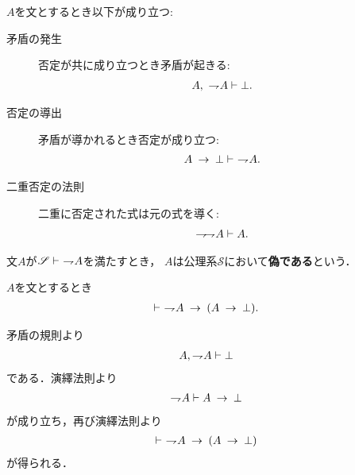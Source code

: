 	\begin{screen}
		\begin{logicalaxm}[矛盾と否定に関する規則]\label{logicalaxm:rules_of_contradiction}
			$A$を文とするとき以下が成り立つ:
			\begin{description}
				\item[矛盾の発生] 否定が共に成り立つとき矛盾が起きる:
					\begin{align}
						A,\ \rightharpoondown\hspace{-0.25em} A \vdash \bot.
					\end{align}
				\item[否定の導出] 矛盾が導かれるとき否定が成り立つ:
					\begin{align}
						A \hspace{0.25em}\rightarrow\hspace{0.25em} \bot \vdash\ \rightharpoondown\hspace{-0.25em} A.
					\end{align}
				\item[二重否定の法則] 二重に否定された式は元の式を導く:
					\begin{align}
						\rightharpoondown\hspace{-0.25em} \rightharpoondown\hspace{-0.25em} A \vdash A.
					\end{align}
			\end{description}
		\end{logicalaxm}
	\end{screen}
	
	文$A$が$\mathscr{S} \vdash\ \rightharpoondown\hspace{-0.25em} A$を満たすとき，
	$A$は公理系$\mathscr{S}$において{\bf 偽である}という．
	
	\begin{screen}
		\begin{logicalthm}[偽な式は矛盾を導く]\label{logicalthm:false_and_negation_are_equivalent}
			$A$を文とするとき
			\begin{align}
				\vdash\ \rightharpoondown\hspace{-0.25em} A \hspace{0.25em}\rightarrow\hspace{0.25em} (A \hspace{0.25em}\rightarrow\hspace{0.25em} \bot).
			\end{align}
		\end{logicalthm}
	\end{screen}
	
	\begin{prf}
		矛盾の規則より
		\begin{align}
			A,\rightharpoondown\hspace{-0.25em} A \vdash \bot
		\end{align}
		である．演繹法則より
		\begin{align}
			\rightharpoondown\hspace{-0.25em} A \vdash A \hspace{0.25em}\rightarrow\hspace{0.25em} \bot
		\end{align}
		が成り立ち，再び演繹法則より
		\begin{align}
			\vdash\ \rightharpoondown\hspace{-0.25em} A \hspace{0.25em}\rightarrow\hspace{0.25em} (A \hspace{0.25em}\rightarrow\hspace{0.25em} \bot)
		\end{align}
		が得られる．
		\QED
	\end{prf}
	
